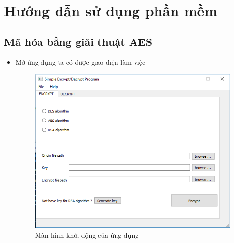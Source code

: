 \documentclass[a4paper]{article}
\begin{document}
\section{Hướng dẫn sử dụng phần mềm}

	\subsection{Mã hóa bằng giải thuật AES}
	\begin{itemize}
	\item
Mở ứng dụng ta có được giao diện làm việc
\begin{center}
    \begin{figure}[H]
    \begin{center}
     \includegraphics[scale=.5]{hinh/aes-1}
    \end{center}
    \caption{Màn hình khởi động của ứng dụng}
    \label{refhinh1}
    \end{figure}
\end{center}


\end{itemize}
\end{document}
